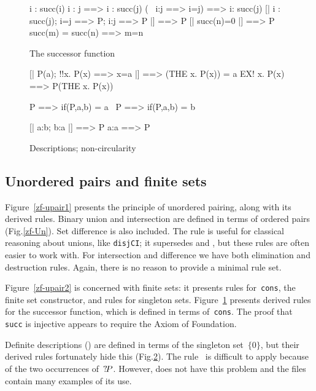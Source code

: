 \begin{figure}
\begin{ttbox}
       i : succ(i)
       i : j ==> i : succ(j)
       (~ i:j ==> i=j) ==> i: succ(j)
        [| i : succ(j);  i=j ==> P;  i:j ==> P |] ==> P
   [| succ(n)=0 |] ==> P
  succ(m) = succ(n) ==> m=n
\end{ttbox}
\caption{The successor function} \label{zf-succ}
\end{figure}


\begin{figure}
\begin{ttbox}
     [| P(a);  !!x. P(x) ==> x=a |] ==> (THE x. P(x)) = a
             EX! x. P(x) ==> P(THE x. P(x))

              P ==> if(P,a,b) = a
         ~P ==> if(P,a,b) = b

         [| a:b;  b:a |] ==> P
       a:a ==> P
\end{ttbox}
\caption{Descriptions; non-circularity} \label{zf-the}
\end{figure}


\subsection{Unordered pairs and finite sets}
Figure~\ref{zf-upair1} presents the principle of unordered pairing, along
with its derived rules.  Binary union and intersection are defined in terms
of ordered pairs (Fig.\ts\ref{zf-Un}).  Set difference is also included.  The
rule  is useful for classical reasoning about unions,
like {\tt disjCI}\@; it supersedes  and
, but these rules are often easier to work with.  For
intersection and difference we have both elimination and destruction rules.
Again, there is no reason to provide a minimal rule set.

Figure~\ref{zf-upair2} is concerned with finite sets: it presents rules
for~{\tt cons}, the finite set constructor, and rules for singleton
sets.  Figure~\ref{zf-succ} presents derived rules for the successor
function, which is defined in terms of~{\tt cons}.  The proof that {\tt
  succ} is injective appears to require the Axiom of Foundation.

Definite descriptions () are defined in terms of the singleton
set~$\{0\}$, but their derived rules fortunately hide this
(Fig.\ts\ref{zf-the}).  The rule~ is difficult to apply
because of the two occurrences of~${?\!P}$.  However,
 does not have this problem and the files contain
many examples of its use.

